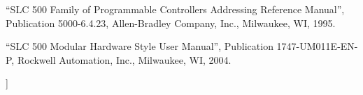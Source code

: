 \vskip 10pt

\noindent
``SLC 500 Family of Programmable Controllers Addressing Reference Manual'', Publication 5000-6.4.23, Allen-Bradley Company, Inc., Milwaukee, WI, 1995.

\vskip 10pt

\noindent
``SLC 500 Modular Hardware Style User Manual'', Publication 1747-UM011E-EN-P, Rockwell Automation, Inc., Milwaukee, WI, 2004.















]
